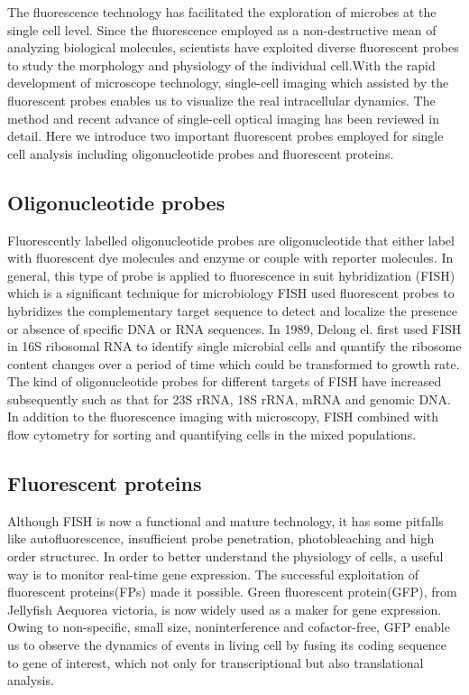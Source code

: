 \documentclass[fleqn,10pt]{wlscirep}
\begin{document}
The fluorescence technology has facilitated the exploration of microbes at the single cell level. Since the fluorescence employed as a non-destructive mean of analyzing biological molecules, scientists have exploited diverse fluorescent probes to study the morphology and physiology of the individual cell\cite{Brehm-Stecher2004}.With the rapid development of microscope technology, single-cell imaging which assisted by the fluorescent probes enables us to visualize the real intracellular dynamics. The method and recent advance of single-cell optical imaging has been reviewed in detail\cite{Stender2013}. Here we introduce two important fluorescent probes employed for single cell analysis including oligonucleotide probes and fluorescent proteins. 

\subsection[]{Oligonucleotide probes}
Fluorescently labelled oligonucleotide probes are oligonucleotide that either label with fluorescent dye molecules and enzyme or couple with reporter molecules. In general, this type of probe is applied to fluorescence in suit hybridization (FISH) which is a significant technique for microbiology\cite{Moter2000} FISH used fluorescent probes to hybridizes the complementary target sequence to detect and localize the presence or absence of specific DNA or RNA sequences. In 1989, Delong el. first used FISH in 16S ribosomal RNA to identify single microbial cells and quantify the ribosome content changes over a period of time which could be transformed to growth rate\cite{DeLong1989}. The kind of oligonucleotide probes  for different targets of FISH have increased subsequently such as that for 23S rRNA\cite{Manz1993,Amann1995}, 18S rRNA\cite{Lischewski1996}, mRNA\cite{Wagner1998} and genomic DNA\cite{Zwirglmaier2004}. In addition to the fluorescence imaging with microscopy, FISH combined with flow cytometry for sorting and quantifying cells in the mixed populations\cite{Wallner1993}.

\subsection[]{Fluorescent proteins}
Although FISH is now a functional and mature technology, it has some pitfalls like autofluorescence, insufficient probe penetration, photobleaching and high order structure\cite{Moter2000}c. In order to better understand the physiology of cells, a useful way is to monitor real-time gene expression. The successful exploitation of fluorescent proteins(FPs) made it possible. Green fluorescent protein(GFP), from Jellyfish Aequorea victoria\cite{SHIMOMURA1962}, is now widely used as a maker for gene expression. Owing to non-specific, small size, noninterference and cofactor-free, GFP enable us to observe the dynamics of events in living cell by fusing its coding sequence to gene of interest\cite{Stearns1995}, which not only for transcriptional but also translational analysis.
\end{document}
